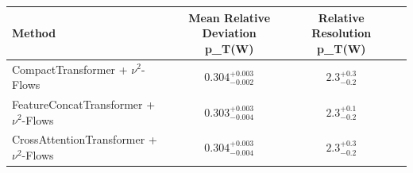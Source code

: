     \begin{tabular}{lccc}
        \toprule
        Method & Mean Relative Deviation p_{T}(W) & Relative Resolution p_{T}(W) \\
        \midrule
        CompactTransformer + $\nu^2$-Flows & $0.304_{-0.002}^{+0.003}$ & $2.3_{-0.2}^{+0.3}$ \\
        FeatureConcatTransformer + $\nu^2$-Flows & $0.303_{-0.004}^{+0.003}$ & $2.3_{-0.2}^{+0.1}$ \\
        CrossAttentionTransformer + $\nu^2$-Flows & $0.304_{-0.004}^{+0.003}$ & $2.3_{-0.2}^{+0.3}$ \\
        \bottomrule
    \end{tabular}